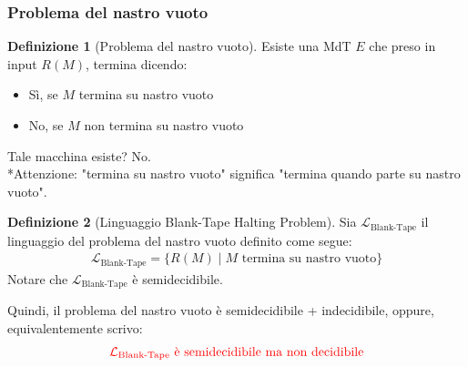 \documentclass{article}  %
\theoremstyle{definition}
\newtheorem{definition}{Definizione}[section]
\begin{document}
\subsubsection{Problema del nastro vuoto}
\begin{definition}[Problema del nastro vuoto]
	Esiste una MdT $E$ che preso in input $R(M)$, termina dicendo:
	\begin{itemize}
		\item Sì, se $M$ termina su nastro vuoto
		\item No, se $M$ non termina su nastro vuoto
	\end{itemize}
	Tale macchina esiste? No. \\
	\footnotesize %
	*Attenzione: "termina su nastro vuoto" significa "termina quando parte su nastro vuoto".
\end{definition}
\begin{definition}[Linguaggio Blank-Tape Halting Problem]
	Sia $\mathcal{L}_{\text{Blank-Tape}}$ il linguaggio del problema del nastro vuoto definito come segue:
	\begin{align*}
		\mathcal{L}_{\text{Blank-Tape}} = \{R(M) \mid M \text{ termina su nastro vuoto}\}
	\end{align*}
	Notare che $\mathcal{L}_{\text{Blank-Tape}}$ è semidecidibile.
\end{definition}
Quindi, il problema del nastro vuoto è semidecidibile + indecidibile, oppure, equivalentemente scrivo:
\begin{align*}
	\textcolor{red}{\mathcal{L}_{\text{Blank-Tape}} \text{ è semidecidibile ma non decidibile}}
\end{align*}
\end{document}
